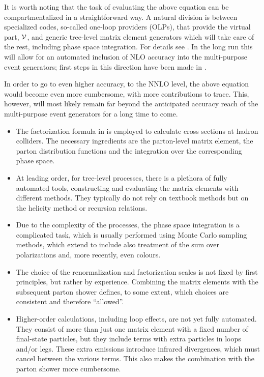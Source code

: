 It is worth noting that the task of evaluating the above equation can be
compartmentalized in a straightforward way.  A natural division is between
specialized codes, so-called one-loop providers (OLPs), that provide the 
virtual part, ${\cal V}$, and generic tree-level matrix element generators
which will take care of the rest, including phase space integration.
For details see .  In the long run this will allow
for an automated inclusion of NLO accuracy into the multi-purpose
event generators; first steps in this direction have been made
in \cite{Binoth:2010xt,Alioli:2010xd,Hoeche:2010pf}.

In order to go to even higher accuracy, \ie to the NNLO level,
the above equation would become even more cumbersome, with more
contributions to trace.  This, however, will most likely remain far beyond 
the anticipated accuracy reach of the multi-purpose event generators for a 
long time to come.

\begin{itemize}
\item The factorization formula in 
  is employed to calculate cross sections at hadron colliders.  The
  necessary ingredients are the parton-level matrix element, the
  parton distribution functions and the integration over the
  corresponding phase space.
\item At leading order, \ie for tree-level processes, there is a plethora
      of fully automated tools, constructing and evaluating the matrix elements
      with different methods.  They typically do not rely on textbook methods
      but on the helicity method or recursion relations.  
\item Due to the complexity of the processes, the phase space integration
      is a complicated task, which is usually performed using Monte
      Carlo sampling methods, which extend to include also treatment of
      the sum over polarizations and, more recently, even colours.  
\item The choice of the renormalization and factorization scales is not
      fixed by first principles, but rather by experience.  Combining the
      matrix elements with the subsequent parton shower defines, to some 
      extent, which choices are consistent and therefore ``allowed''.
\item Higher-order calculations, \ie including loop effects, are not yet
      fully automated.  They consist of more than just one matrix element
      with a fixed number of final-state particles, but they include 
      terms with extra particles in loops and/or legs.  These extra emissions
      introduce infrared divergences, which must cancel between the
      various terms.  This also makes the combination with the parton shower
      more cumbersome.  
\end{itemize}

